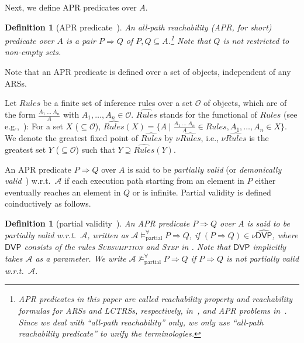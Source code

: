 \documentclass[10pt,a4paper]{article}
\newtheorem{definition}[theorem]{Definition}
\def\cA{\mathcal{A}}
\def\cO{\mathcal{O}}
\newcommand{\ReachPred}[2]{#1 \Rightarrow #2}
\newcommand{\Valid}[3]{#2 \mathrel{\mathrel{\models^\forall_{\mathrm{#1}}}} #3}
\newcommand{\NotValid}[3]{#2 \mathrel{\mathrel{\not\models^\forall_{\mathrm{#1}}}} #3}
\newcommand{\PartiallyValid}[2][\cA]{\Valid{partial}{#1}{#2}}
\newcommand{\NotPartiallyValid}[2][\cA]{\NotValid{partial}{#1}{#2}}
\newcommand{\RuleName}[1]{{\rm \textsc{#1}}}
\newcommand{\DVP}[1][]{\mathsf{DVP}}
\begin{document}
Next, we define APR predicates over $A$.
\begin{definition}[APR predicate~\cite{CL18}]
	An \emph{all-path reachability} (APR, for short) \emph{predicate} over $A$ is a pair $\ReachPred{P}{Q}$ of $P,Q \subseteq A$.\footnote{APR predicates in this paper are called \emph{reachability property} and \emph{reachability formulas} for ARSs and LCTRSs, respectively, in~\cite{CL18}, and \emph{APR problems} in~\cite{KN23jlamp,KN23padl,KN24jip,Kojima24phd}.
		Since we deal with ``all-path reachability'' only, we only use ``all-path reachability predicate'' to unify the terminologies.}
	Note that $Q$ is not restricted to non-empty sets.
\end{definition}
Note that an APR predicate is defined over a set of objects, independent of any ARSs.

Let $\mathit{Rules}$ be a finite set of inference rules over a set $\cO$ of objects, which are of the form $\frac{A_1~\ldots~A_n}{A}$ with $A_1,\ldots,A_n \in \cO$.
$\widehat{\mathit{Rules}}$ stands for the functional of $\mathit{Rules}$ (see e.g.,~\cite[Appendix~A.2]{CL18corr}):
For a set $X$ ($\subseteq \cO$),
$\widehat{\mathit{Rules}}(X) = \{ A \mid \frac{A_1~\ldots~A_n}{A} \in \mathit{Rules},
	A_1,\ldots,A_n \in X \}$.
We denote the greatest fixed point of $\widehat{\mathit{Rules}}$ by $\nu\widehat{\mathit{Rules}}$, i.e., $\nu\widehat{\mathit{Rules}}$ is the greatest set $Y$ ($\subseteq \cO$) such that $Y \supseteq \widehat{\mathit{Rules}}(Y)$.

An APR predicate $\ReachPred{P}{Q}$ over $A$ is said to be \emph{partially valid} (or \emph{demonically valid}~\cite{CL18}) w.r.t.\ $\cA$ if each execution path starting from an element in $P$ either eventually reaches an element in $Q$ or is infinite.
Partial validity is defined coinductively as follows.
\begin{definition}[partial validity~\cite{CL18}]
	\label{def:DVP}
	An APR predicate $\ReachPred{P}{Q}$ over $A$ is said to be \emph{partially valid} w.r.t.\ $\cA$, written as $\PartiallyValid[\cA]{\ReachPred{P}{Q}}$,
	if $(\ReachPred{P}{Q}) \in \nu\widehat{\DVP[\cA]}$, where $\DVP$ consists of
	the rules \RuleName{Subsumption} and \RuleName{Step} in .
	Note that $\DVP$ implicitly takes $\cA$ as a parameter.
	We write $\NotPartiallyValid[\cA]{\ReachPred{P}{Q}}$ if $\ReachPred{P}{Q}$ is not partially valid w.r.t.\ $\cA$.
\end{definition}
\end{document}
